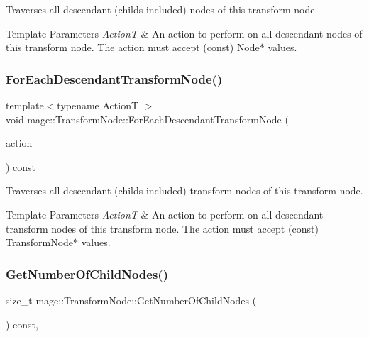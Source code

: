 Traverses all descendant (childs included) nodes of this transform node.


\begin{DoxyTemplParams}{Template Parameters}
{\em ActionT} & An action to perform on all descendant nodes of this transform node. The action must accept ({\ttfamily const}) {\ttfamily Node$\ast$} values. \\
\hline
\end{DoxyTemplParams}
\hypertarget{classmage_1_1_transform_node_a7a052715d9591defa06e494017539711}{}\label{classmage_1_1_transform_node_a7a052715d9591defa06e494017539711} 
\subsubsection{\texorpdfstring{For\+Each\+Descendant\+Transform\+Node()}{ForEachDescendantTransformNode()}}
{\footnotesize\ttfamily template$<$typename ActionT $>$ \\
void mage\+::\+Transform\+Node\+::\+For\+Each\+Descendant\+Transform\+Node (\begin{DoxyParamCaption}\item[{ActionT}]{action }\end{DoxyParamCaption}) const\hspace{0.3cm}{\ttfamily [private]}}

Traverses all descendant (childs included) transform nodes of this transform node.


\begin{DoxyTemplParams}{Template Parameters}
{\em ActionT} & An action to perform on all descendant transform nodes of this transform node. The action must accept ({\ttfamily const}) {\ttfamily Transform\+Node$\ast$} values. \\
\hline
\end{DoxyTemplParams}
\hypertarget{classmage_1_1_transform_node_a3efc0401cee8fc6215148963ce3e8227}{}\label{classmage_1_1_transform_node_a3efc0401cee8fc6215148963ce3e8227} 
\subsubsection{\texorpdfstring{Get\+Number\+Of\+Child\+Nodes()}{GetNumberOfChildNodes()}}
{\footnotesize\ttfamily size\+\_\+t mage\+::\+Transform\+Node\+::\+Get\+Number\+Of\+Child\+Nodes (\begin{DoxyParamCaption}{ }\end{DoxyParamCaption}) const\hspace{0.3cm}{\ttfamily [private]}, {\ttfamily [noexcept]}}

